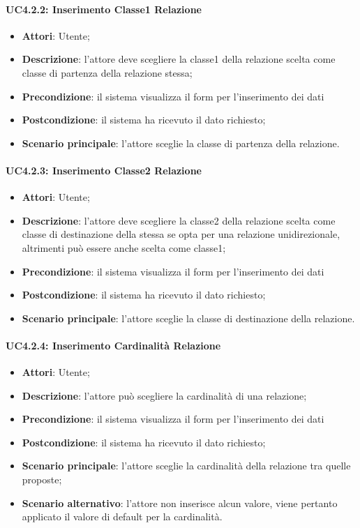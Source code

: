 \paragraph{UC4.2.2: Inserimento Classe1 Relazione}
\label{UC4.2.2}
\begin{itemize}
	\item \textbf{Attori}: Utente;
	\item \textbf{Descrizione}: l'attore deve scegliere la classe1 della relazione scelta come classe di partenza della relazione stessa;
	\item \textbf{Precondizione}: il sistema visualizza il form per l'inserimento dei dati
	\item \textbf{Postcondizione}: il sistema ha ricevuto il dato richiesto;
	\item \textbf{Scenario principale}: l'attore sceglie la classe di partenza della relazione.
\end{itemize}

\paragraph{UC4.2.3: Inserimento Classe2 Relazione}
\label{UC4.2.3}
\begin{itemize}
	\item \textbf{Attori}: Utente;
	\item \textbf{Descrizione}: l'attore deve scegliere la classe2 della relazione scelta come classe di destinazione della stessa se opta per una relazione unidirezionale, altrimenti può essere anche scelta come classe1;
	\item \textbf{Precondizione}: il sistema visualizza il form per l'inserimento dei dati
	\item \textbf{Postcondizione}: il sistema ha ricevuto il dato richiesto;
	\item \textbf{Scenario principale}: l'attore sceglie la classe di destinazione della relazione.
\end{itemize}

\paragraph{UC4.2.4: Inserimento Cardinalità Relazione}
\label{UC4.2.4}
\begin{itemize}
	\item \textbf{Attori}: Utente;
	\item \textbf{Descrizione}: l'attore può scegliere la cardinalità di una relazione;
	\item \textbf{Precondizione}: il sistema visualizza il form per l'inserimento dei dati
	\item \textbf{Postcondizione}: il sistema ha ricevuto il dato richiesto;
	\item \textbf{Scenario principale}: l'attore sceglie la cardinalità della relazione tra quelle proposte;
	\item \textbf{Scenario alternativo}: l'attore non inserisce alcun valore, viene pertanto applicato il valore di default per la cardinalità.
\end{itemize}

